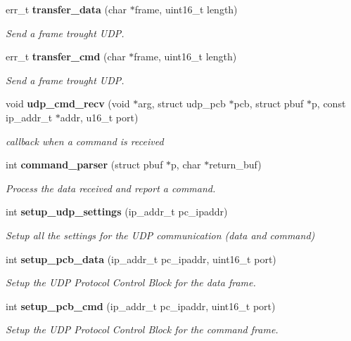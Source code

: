 \begin{DoxyCompactItemize}
\item 
err\+\_\+t \textbf{ transfer\+\_\+data} (char $\ast$frame, uint16\+\_\+t length)
\begin{DoxyCompactList}\small\item\em Send a frame trought U\+DP. \end{DoxyCompactList}\item 
err\+\_\+t \textbf{ transfer\+\_\+cmd} (char $\ast$frame, uint16\+\_\+t length)
\begin{DoxyCompactList}\small\item\em Send a frame trought U\+DP. \end{DoxyCompactList}\item 
void \textbf{ udp\+\_\+cmd\+\_\+recv} (void $\ast$arg, struct udp\+\_\+pcb $\ast$pcb, struct pbuf $\ast$p, const ip\+\_\+addr\+\_\+t $\ast$addr, u16\+\_\+t port)
\begin{DoxyCompactList}\small\item\em callback when a command is received \end{DoxyCompactList}\item 
int \textbf{ command\+\_\+parser} (struct pbuf $\ast$p, char $\ast$return\+\_\+buf)
\begin{DoxyCompactList}\small\item\em Process the data received and report a command. \end{DoxyCompactList}\item 
int \textbf{ setup\+\_\+udp\+\_\+settings} (ip\+\_\+addr\+\_\+t pc\+\_\+ipaddr)
\begin{DoxyCompactList}\small\item\em Setup all the settings for the U\+DP communication (data and command) \end{DoxyCompactList}\item 
int \textbf{ setup\+\_\+pcb\+\_\+data} (ip\+\_\+addr\+\_\+t pc\+\_\+ipaddr, uint16\+\_\+t port)
\begin{DoxyCompactList}\small\item\em Setup the U\+DP Protocol Control Block for the data frame. \end{DoxyCompactList}\item 
int \textbf{ setup\+\_\+pcb\+\_\+cmd} (ip\+\_\+addr\+\_\+t pc\+\_\+ipaddr, uint16\+\_\+t port)
\begin{DoxyCompactList}\small\item\em Setup the U\+DP Protocol Control Block for the command frame. \end{DoxyCompactList}\item 

\end{DoxyCompactItemize}
